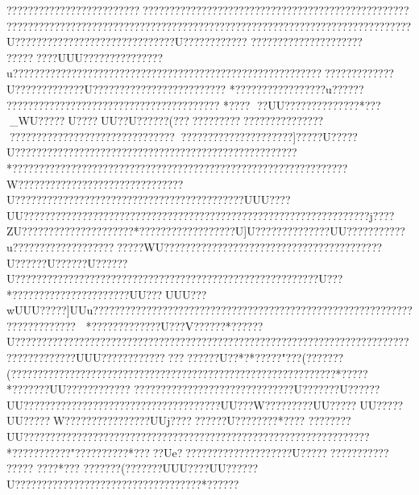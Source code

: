 {{{{{{{{{{{{{{{{{{{{{{{{{{{{{{{{{{{{{{{{{{{{{{{{{{{{{{{{{{{{{{{{{{{{{{{{{{{{{{{{{{{{{{{{{{{{{{{{{{{{{{{{{{{{{{{{{{{{{{{{{{{{{{{{{{{{{{{{{{{{{{{{{{{{{{{{{{{{{{{{{{{{{{{{{{{{{{{{{{{{{{{{{{{{{{{{{{{{{{{{{{{{{{{{{{{{{{{{{{{{{{{{{{{{{{{{{{{{{{{{{{{{{{{{{{{{{{{{{{{{{{{{{{{{{{{{{{{{{{{{{{{{{{{{{{{{{{{{{{{{{{{{{{{{{{{{{{{{{{{{{{{{{{{{{{{{{{{{{{{{{{{{{{{{{{{{{{{{{{{{{{{{{{{{{{{{{{{{{{{{{{{{{{{{{{{{{{{{{{{{{{{{{{{{{{{{{{{{{{{{{{{{{{{{{{{{{{{{{{{{{{{{{{{{{{{{{{{{{{{{{{{{{{{{{{{{{{{{{{{{{{{{{{{{{{{{{{{{{{{{{{{{{{{{{{{{{{{{{{{{{{{{{{{{{{{{{{{{{{{{{{{{{{{{{{{{{{{{{{{{{{{{{{{{{{{{{{{{{{{{{{{{{{{{{{{{{{{{{{{{{{{{{{{{{{{{{{{{{{{{{{{{{{{{{{{{{{{{{{{{{{{{{{{{{{{{{{{{{{{{{{{{{{{{{{{{{{{{{{{{{{{{{{{{{{{{{{{{{{{{{{{{{{{{{{{{{{{{{{{{{{{{{{{{{{{{{{{{{{{{{{{{{{{{{{{{{{{{{{{{{{{{{{{{{{{{{{{{{{{{{{{{{{{{{{{{{{{{{{{{{{{{{{{{{{{{{{{{{{{{{{{{{{{{{{{{{{{{{{{{{{{{{{{{{{{{{{{{{{{{{{{{{{{{{{{{{{{{{{{{{{{{{{{{{{{{{{{{{{{{{{{{{{{{{{{{{{{{{{{{{{{{{{{{{{{{{{{{{{{{{{{{{{{{{{{{{{{{{{{{{{{{{{{{{{{{{{{{{{{{{{{{{{{{{{{{{{{{{{{{{{{{{{{{{{{{{{{{{{{{{{{{{{{{{{{{{{{{{{{{{{{{{{{{{{{{{{{{{{{{{{{{{{{{{{{{{{{{{{{{{{{{{{{{{{{{{{{{{{{{{{{{{{{{{{{{{{{{{{{{{{{{{{{{{{{{{{{{{{{{{{{{{{{{{{{{{{{{{{{{{{{{{{{{{{{{{{{{{{{{{{{{{{{{{{{{{{{{{{{{{{{{{{{{{{{{{{{{{{{{{{{{{{{{{{{{{{{{{{{{{{{{{{{{{{{{{{{{{{{{{{{{{{{{{{{{{{{{{???????????????????????????????????????????????????????????????????????????????????????????????????????????????????????????????????????????????????????U??????????????????????????????U????????????
??????? ??????????????  
????   ?????UUU???????????????u????????????????????????????????????????????? ??????????????????????????U?????????????U?????????????????????????
*???? ? ????????????u?????? ????????????????????????????????????????
*????  
??UU  ??   ????????????*???_WU?????U????UU??U??????  (????????  ????  ??? ?????  ???????????????????????????????????????????????????????????]?????U?????U??????????????   ????????????  ???????????????????????????
*???????????????????????????????????????????????????????????????W???????????????????????????????U???????????????????? ?????? ???????  ?????  ?????UUU????UU????????????????? ??????????? ???????????????????????????   ???  ???????j????ZU?????????????????????  *???   ???????????   ????U]U???   ???????????UU???????????u????????????????????????WU?????????????????????????????????????????U??????U??????U??????U?????????????????????????????????????????????????????????U???*??????????????????????UU???UUU???wUUU??    ???]UUu????????   ???   ???   ???????????????????????????????????????????????????????????
*?????????????U???V??????*??????U????????????????????????? ??????????????????????????????????????????????????????????????UUU??????????????}???????U??*?*?????"???(???????( ????????????????????????????????????????????????????????????? *?????
*???????UU???????????? 
??????????????????????????????U???????U??????UU????  ?????? ??????? ??????? ???????   ??????UU???W?????????UU?????UU?????UU?????W????????????????UUj????  ??????U???????? *????  
????   ????UU?????????????????????????????????????????????????????????????????*???????????"????? ?????  *???   ??Ue???    ?????????    ?????????U?????   ??    ??    ?? ????? ????? 
????  *???  
???  ????  (???   ????UUU????UU??????U???????????????????????????????????*?????? }}}}}}}}}}}}}}}}}}}}}}}}}}}}}}}}}}}}}}}}}}}}}}}}}}}}}}}}}}}}}}}}}}}}}}}}}}}}}}}}}}}}}}}}}}}}}}}}}}}}}}}}}}}}}}}}}}}}}}}}}}}}}}}}}}}}}}}}}}}}}}}}}}}}}}}}}}}}}}}}}}}}}}}}}}}}}}}}}}}}}}}}}}}}}}}}}}}}}}}}}}}}}}}}}}}}}}}}}}}}}}}}}}}}}}}}}}}}}}}}}}}}}}}}}}}}}}}}}}}}}}}}}}}}}}}}}}}}}}}}}}}}}}}}}}}}}}}}}}}}}}}}}}}}}}}}}}}}}}}}}}}}}}}}}}}}}}}}}}}}}}}}}}}}}}}}}}}}}}}}}}}}}}}}}}}}}}}}}}}}}}}}}}}}}}}}}}}}}}}}}}}}}}}}}}}}}}}}}}}}}}}}}}}}}}}}}}}}}}}}}}}}}}}}}}}}}}}}}}}}}}}}}}}}}}}}}}}}}}}}}}}}}}}}}}}}}}}}}}}}}}}}}}}}}}}}}}}}}}}}}}}}}}}}}}}}}}}}}}}}}}}}}}}}}}}}}}}}}}}}}}}}}}}}}}}}}}}}}}}}}}}}}}}}}}}}}}}}}}}}}}}}}}}}}}}}}}}}}}}}}}}}}}}}}}}}}}}}}}}}}}}}}}}}}}}}}}}}}}}}}}}}}}}}}}}}}}}}}}}}}}}}}}}}}}}}}}}}}}}}}}}}}}}}}}}}}}}}}}}}}}}}}}}}}}}}}}}}}}}}}}}}}}}}}}}}}}}}}}}}}}}}}}}}}}}}}}}}}}}}}}}}}}}}}}}}}}}}}}}}}}}}}}}}}}}}}}}}}}}}}}}}}}}}}}}}}}}}}}}}}}}}}}}}}}}}}}}}}}}}}}}}}}}}}}}}}}}}}}}}}}}}}}}}}}}}}}}}}}}}}}}}}}}}}}}}}}}}}}}}}}}}}}}}}}}}}}}}}}}}}}}}}}}}}}}}}}}}}}}}}}}}}}}}}}}}}}}}}}}}}}}}}}}}}}}}}}}}}}}}}}}}}}}}}}}}}}}}}}}}}}}}}}}}}}}}}}}}}}}}}}}}}}}}}}}}}}}}}}}}}}}}}}}}}}}}}}}}}}}}}}}}}}}}}}}}}}}}}}}}}}}}}}}}}}}}}}}}}}}}}}}}}}}}}}}}}}}}}}}}}}}}}}}}}}}}}}}}}}}}}}}}}}}}}}}}}}}}}}}}}}}}}}}}}}}}}}}}}}}}}}}}}}}}}}}}}}}}}}}}}}}}}}}}}}}}}}}}}}}}}}}}}}}}}}}}}}}}}}}}}}}}}}}}}}}}}}}}
